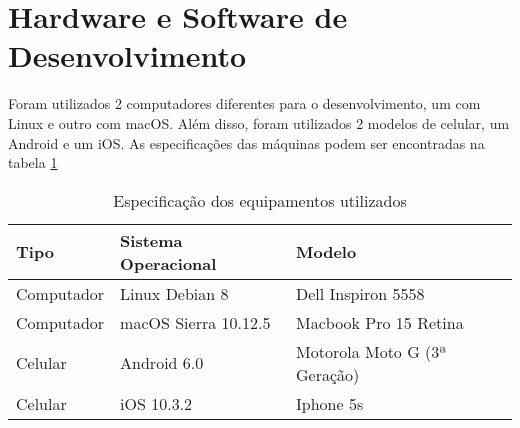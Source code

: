 \section{Hardware e Software de Desenvolvimento}

Foram utilizados 2 computadores diferentes para o desenvolvimento, um com Linux e outro com macOS. Além disso, foram utilizados 2 modelos de celular, um Android e um iOS. As especificações das máquinas podem ser encontradas na tabela \ref{tab-hardware}

\begin{table}[]
\centering
\caption{Especificação dos equipamentos utilizados}
\label{tab-hardware}
\begin{tabular}{l|l|l}
\hline
\textbf{Tipo} & \textbf{Sistema Operacional} & \textbf{Modelo}              \\ \hline
Computador    & Linux Debian 8               & Dell Inspiron 5558           \\ \hline
Computador    & macOS Sierra 10.12.5         & Macbook Pro 15 Retina        \\ \hline
Celular       & Android 6.0                  & Motorola Moto G (3ª Geração) \\ \hline
Celular       & iOS 10.3.2                   & Iphone 5s                    \\ \hline
\end{tabular}
\end{table}
